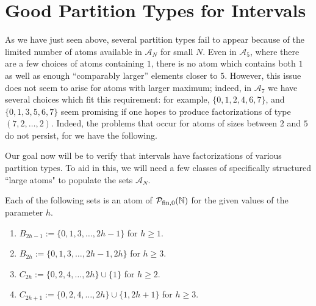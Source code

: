 \section{Good Partition Types for Intervals}

As we have just seen above, several partition types fail to appear because of the limited number of atoms available in $\mathcal{A}_N$ for small $N$.
Even in $\mathcal{A}_5$, where there are a few choices of atoms containing $1$, there is no atom which contains both $1$ as well as enough ``comparably larger'' elements closer to $5$.
However, this issue does not seem to arise for atoms with larger maximum; indeed, in $\mathcal{A}_7$ we have several choices which fit this requirement: for example, $\{0, 1, 2, 4, 6, 7\}$, and $\{0, 1, 3, 5, 6, 7\}$ seem promising if one hopes to produce factorizations of type $(7,2,\dots, 2)$. 
Indeed, the problems that occur for atoms of sizes between $2$ and $5$ do not persist, for we have the following.

Our goal now will be to verify that intervals have factorizations of various partition types.  
To aid in this, we will need a few classes of specifically structured ``large atoms" to populate the sets $\mathcal{A}_N$.

\begin{prop} \label{prop:2-congruence atoms}
	Each of the following sets is an atom of ${\mathcal{P}_{\textrm{fin},0}(\mathbb{N})}$ for the given values of the parameter $h$.
	\begin{enumerate}[label={\rm (\roman{*})}]
		\item $B_{2h-1} := \{0,1,3,\dots, 2h-1\}$ for $h\ge 1$.
		\item $B_{2h} := \{0,1,3,\dots, 2h-1,2h\}$ for $h \ge 3$.
		\item $C_{2h} := \{0,2,4,\dots,2h\}\cup\{1\}$ for $h\ge 2$.
		\item $C_{2h+1} := \{0,2,4,\dots, 2h\}\cup\{1,2h+1\}$ for $h\ge 3$.
	\end{enumerate}
\end{prop}

